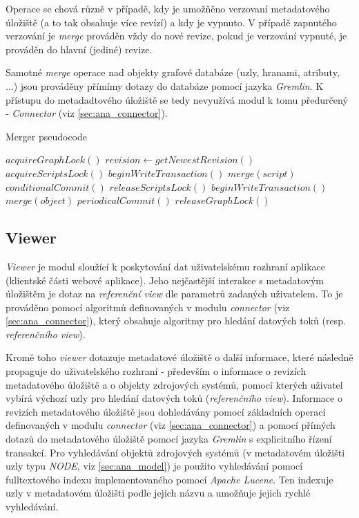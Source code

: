 Operace se chová různě v případě, kdy je umožňěno verzovaní metadatového úložiště (a to tak obsahuje více revízí) a kdy je vypnuto. V případě zapnutého verzování je \textit{merge} prováděn vždy do nové revize, pokud je verzování vypnuté, je prováděn do hlavní (jediné) revize.

Samotné \textit{merge} operace nad objekty grafové databáze (uzly, hranami, atributy, ...) jsou prováděny přímímy dotazy do databáze pomocí jazyka \textit{Gremlin}. K přístupu do metadadtového úložiště se tedy nevyužívá modul k tomu předurčený - \textit{Connector} (viz \ref{sec:ana_connector}).

\begin{algorithm}
\caption{Merger pseudocode}
\label{alg_merger}
\begin{algorithmic}
	\State $acquireGraphLock()$
	\State $revision\gets getNewestRevision()$
		\State $acquireScriptsLock()$
			\State $beginWriteTransaction()$
			\State $merge(script)$
			\State $conditionalCommit()$
		\EndFor
		\State $releaseScriptsLock()$
		\State $beginWriteTransaction()$
			\State $merge(object)$
			\State $periodicalCommit()$
		\EndFor
	\EndIf
	\State $releaseGraphLock()$
\end{algorithmic}
\end{algorithm}

\subsection{Viewer}
\label{sec:ana_viewer}
\textit{Viewer} je modul sloužící k poskytování dat uživatelskému rozhraní aplikace (klientské části webové aplikace). Jeho nejčastější interakce s metadatovým úložištěm je dotaz na \textit{referenční view} dle parametrů zadaných uživatelem. To je prováděno pomocí algoritmů definovaných v modulu \textit{connector} (viz \ref{sec:ana_connector}), který obsahuje algoritmy pro hledání datových toků (resp. \textit{referenčního view}).

Kromě toho \textit{viewer} dotazuje metadatové úložiště o další informace, které následně propaguje do uživatelského rozhraní - především o informace o revizích metadatového úložiště a o objekty zdrojových systémů, pomocí kterých uživatel vybírá výchozí uzly pro hledání datových toků (\textit{referenčního view}). Informace o revizích metadatového úložiště jsou dohledávány pomocí základních operací definovaných v modulu \textit{connector} (viz \ref{sec:ana_connector}) a pomocí přímých dotazů do metadatového úložiště pomocí jazyka \textit{Gremlin} s explicitního řízení transakcí. Pro vyhledávání objektů zdrojových systémů (v metadatovém úložišti uzly typu \textit{NODE}, viz \ref{sec:ana_model}) je použito vyhledávání pomocí fulltextového indexu implementovaného pomocí \textit{Apache Lucene}. Ten indexuje uzly v metadatovém úložišti podle jejich názvu a umožňuje jejich rychlé vyhledávání.


